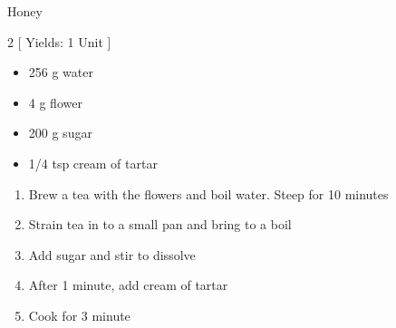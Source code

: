 \begin{Large}
    Honey
\end{Large}

\begin{scriptsize}
\begin{multicols}{2}
[
\vspace{1em}
Yields: 1 Unit
\vspace{-1.5em}
]

\begin{itemize}
    \item 256 g water
    \item 4 g flower
    \item 200 g sugar
    \item 1/4 tsp cream of tartar
\end{itemize}
\end{multicols}
\end{scriptsize}

\begin{footnotesize}
\begin{enumerate}
    \item Brew a tea with the flowers and boil water. Steep for 10 minutes
    \item Strain tea in to a small pan and bring to a boil
    \item Add sugar and stir to dissolve
    \item After 1 minute, add cream of tartar
    \item Cook for 3 minute
\end{enumerate}
\end{footnotesize}

\vspace{2em}

